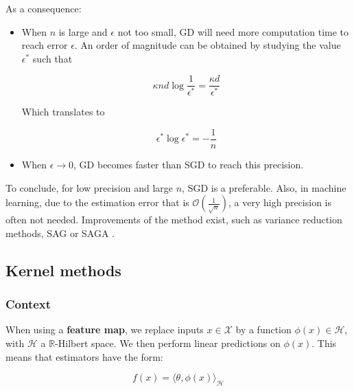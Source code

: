 \documentclass[
10pt, %
a4paper, %
oneside, %
headinclude,footinclude, %
BCOR5mm, %
]{scrartcl}
\begin{document}
As a consequence:
\begin{itemize}
    \item When $n$ is large and $\epsilon$ not too small, GD will need more computation time to reach error $\epsilon$. An order of magnitude can be obtained by studying the value $\epsilon^*$ such that

	\begin{equation}
	   \kappa nd \log \frac{1}{\epsilon^*}  = \frac{\kappa d}{\epsilon^*} 
	\end{equation}

	Which translates to

	\begin{equation}
	    \epsilon^* \log \epsilon^* = -\frac{1}{n}  
	\end{equation}
    \item When $\epsilon \rightarrow 0$, GD becomes faster than SGD to reach this precision.
\end{itemize}

To conclude, for low precision and large $n$, SGD is a preferable. Also, in
machine learning, due to the estimation error that is $ \mathcal{O} (
\frac{1}{\sqrt{n} }) $, a very high precision is often not needed. Improvements
of the method exist, such as variance reduction methods, SAG or SAGA \cite[]{Schmidt2013}. 

\subsection{\large\color{MidnightBlue}Kernel methods}

\subsubsection{\large\color{Periwinkle}Context}

When using a \textbf{{feature map}}, we replace inputs $x\in  \mathcal{X} $ by a function $\phi(x)\in \mathcal{H}$, with $ \mathcal{H} $ a $ \mathbb{R} $-Hilbert space. We then perform linear predictions on $\phi(x)$. This means that estimators have the form: 

\begin{equation}
    \label{eq:scalar_feature_map}
    f(x) = \langle\theta, \phi(x) \rangle_{ \mathcal{H} }
\end{equation}
\end{document}

